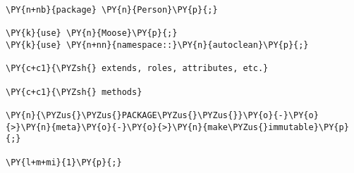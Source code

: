 \begin{Verbatim}[commandchars=\\\{\}]
\PY{n+nb}{package} \PY{n}{Person}\PY{p}{;}
 
\PY{k}{use} \PY{n}{Moose}\PY{p}{;}
\PY{k}{use} \PY{n+nn}{namespace::}\PY{n}{autoclean}\PY{p}{;}
 
\PY{c+c1}{\PYZsh{} extends, roles, attributes, etc.}
 
\PY{c+c1}{\PYZsh{} methods}
 
\PY{n}{\PYZus{}\PYZus{}PACKAGE\PYZus{}\PYZus{}}\PY{o}{-}\PY{o}{>}\PY{n}{meta}\PY{o}{-}\PY{o}{>}\PY{n}{make\PYZus{}immutable}\PY{p}{;}
 
\PY{l+m+mi}{1}\PY{p}{;}
\end{Verbatim}
